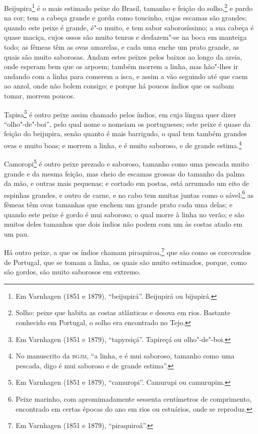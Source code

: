 Beijupira\footnote{ Em Varnhagen (1851 e 1879), ``beijupirá''. Beijupirá ou bijupirá.} é o
mais estimado peixe do Brasil, tamanho e feição do solho,\footnote{ Solho: peixe que habita
as costas atlânticas e desova em rios. Bastante conhecido em Portugal, o solho era
encontrado no Tejo.} e pardo na cor; tem a cabeça grande e gorda como toucinho, cujas
escamas são grandes; quando este peixe é grande, é"-o muito, e tem sabor saborosíssimo; a
sua cabeça é quase maciça, cujos ossos são muito tenros e desfazem"-se na boca em manteiga
todo; as fêmeas têm as ovas amarelas, e cada uma enche um prato grande, as quais são muito
saborosas. Andam estes peixes pelos baixos ao longo da areia, onde esperam bem que os
arpoem; também morrem a linha, mas hão"-lhes ir andando com a linha para comerem a isca, e
assim a vão seguindo até que caem ao anzol, onde não bolem consigo; e porque há poucos
índios que os saibam tomar, morrem poucos.

Tapisa\footnote{ Em Varnhagen (1851 e 1879), ``tapyrsiçá''. Tapireçá ou olho"-de"-boi.} é
outro peixe assim chamado pelos índios, em cuja língua quer dizer ``olho"-de"-boi'', pelo
qual nome o nomeiam os portugueses; este peixe é quase da feição do beijupira, senão
quanto é mais barrigudo, o qual tem também grandes ovas e muito boas; e morrem a linha, e
é muito saboroso, e de grande estima.\footnote{ No manuscrito da \textsc{bgjm}, ``a linha,
e é mui saboroso, tamanho como uma pescada, digo é mui saboroso e de grande estima''.}

Camoropi\footnote{ Em Varnhagen (1851 e 1879), ``camuropi''. Camurupi ou camurupim.} é
outro peixe prezado e saboroso, tamanho como uma pescada muito grande e da mesma feição,
mas cheio de escamas grossas do tamanho da palma da mão, e outras mais pequenas; e cortado
em postas, está arrumado um eito de espinhas grandes, e outro de carne, e no cabo tem
muitas juntas como o sável;\footnote{ Peixe marinho, com apromimadamente sessenta centímetros de
comprimento, encontrado em certas épocas do ano em rios ou estuários, onde se reproduz.}
as fêmeas têm ovas tamanhas que enchem um grande prato cada uma delas; e quando este peixe
é gordo é mui saboroso; o qual morre à linha no verão; e são muitos deles tamanhos que
dois índios não podem com um às costas atado em um pau.

Há outro peixe, a que os índios chamam piraquiroa,\footnote{ Em Varnhagen (1851 e 1879),
``piraquiroâ''.} que são como os corcovados de Portugal, que se tomam a linha, os quais
são muito estimados, porque, como são gordos, são muito saborosos em extremo.

